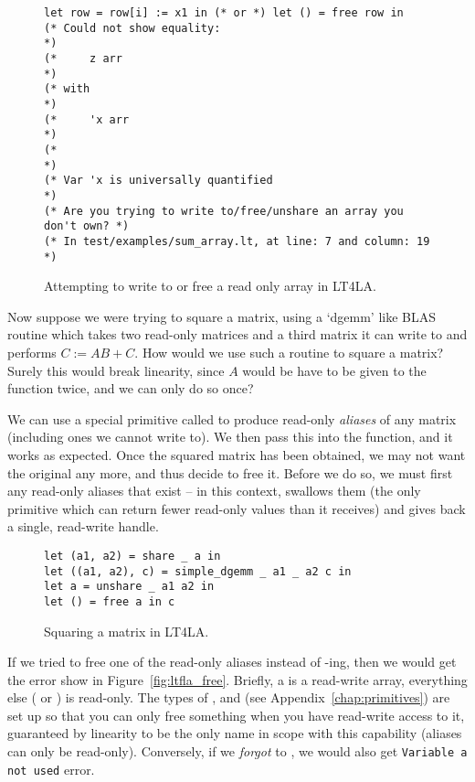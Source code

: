\begin{figure}[tp]
    \begin{verbatim}
let row = row[i] := x1 in (* or *) let () = free row in
(* Could not show equality:                                        *)
(*     z arr                                                       *)
(* with                                                            *)
(*     'x arr                                                      *)
(*                                                                 *)
(* Var 'x is universally quantified                                *)
(* Are you trying to write to/free/unshare an array you don't own? *)
(* In test/examples/sum_array.lt, at line: 7 and column: 19        *)
    \end{verbatim}
    \caption{Attempting to write to or free a read only array in
    LT4LA.}\label{fig:ltfla_univ}
\end{figure}

Now suppose we were trying to square a matrix, using a `dgemm' like BLAS
routine which takes two read-only matrices and a third matrix it can write to
and performs $C := AB + C$. How would we use such a routine to square a matrix?
Surely this would break linearity, since $A$ would be have to be given to the
function twice, and we can only do so once?

We can use a special primitive called  to produce read-only
\emph{aliases} of any matrix (including ones we cannot write to). We then pass
this into the function, and it works as expected. Once the squared matrix has
been obtained, we may not want the original any more, and thus decide to free
it. Before we do so, we must first  any read-only aliases that
exist -- in this context,  swallows them (the only primitive
which can return fewer read-only values than it receives) and gives back a
single, read-write handle.

\begin{figure}[tp]
    \begin{verbatim}
let (a1, a2) = share _ a in
let ((a1, a2), c) = simple_dgemm _ a1 _ a2 c in
let a = unshare _ a1 a2 in
let () = free a in c
    \end{verbatim}
    \caption{Squaring a matrix in LT4LA.}\label{fig:ltfla_square}
\end{figure}

If we tried to free one of the read-only aliases instead of
-ing, then we would get the error show in
Figure~\ref{fig:ltfla_free}. Briefly, a  is a read-write array,
everything else ( or ) is read-only. The types of
,  and  (see
Appendix~\ref{chap:primitives}) are set up so that you can only free something
when you have read-write access to it, guaranteed by linearity to be the only
name in scope with this capability (aliases can only be read-only). Conversely,
if we \emph{forgot} to , we would also get \texttt{Variable a not
used} error.

